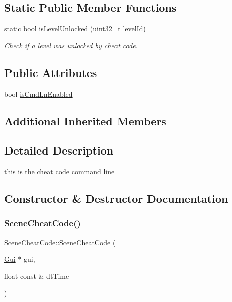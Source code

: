 \subsection*{Static Public Member Functions}
\begin{DoxyCompactItemize}
\item 
static bool \hyperlink{class_scene_cheat_code_a4694632bb07f80ac6668ba0e9cfcb63e}{is\+Level\+Unlocked} (uint32\+\_\+t level\+Id)
\begin{DoxyCompactList}\small\item\em Check if a level was unlocked by cheat code. \end{DoxyCompactList}\end{DoxyCompactItemize}
\subsection*{Public Attributes}
\begin{DoxyCompactItemize}
\item 
bool \hyperlink{class_scene_cheat_code_a296f8798b10214fe5653255d73f2da22}{is\+Cmd\+Ln\+Enabled}
\end{DoxyCompactItemize}
\subsection*{Additional Inherited Members}


\subsection{Detailed Description}
this is the cheat code command line 

\subsection{Constructor \& Destructor Documentation}
\mbox{\label{class_scene_cheat_code_a9ab386f316841370e11d795d5189a0a1}} 
\subsubsection{\texorpdfstring{Scene\+Cheat\+Code()}{SceneCheatCode()}\hspace{0.1cm}{\footnotesize\ttfamily [1/2]}}
{\footnotesize\ttfamily Scene\+Cheat\+Code\+::\+Scene\+Cheat\+Code (\begin{DoxyParamCaption}\item[{\hyperlink{class_gui}{Gui} $\ast$}]{gui,  }\item[{float const \&}]{dt\+Time }\end{DoxyParamCaption})}



